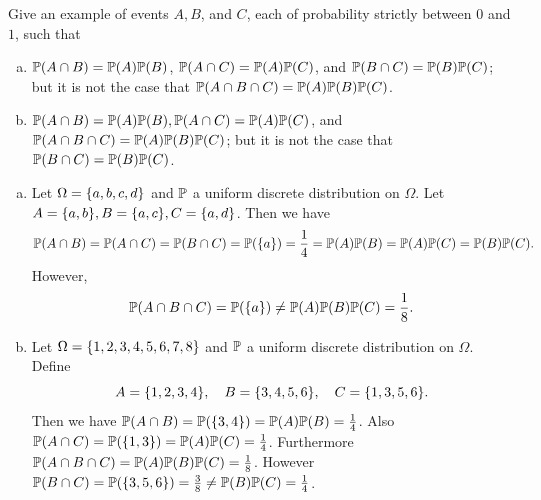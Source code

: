 \begin{problem}
	Give an example of events $ A,B $, and $ C $, each of probability strictly between $ 0 $ and $ 1 $, such that 
	\begin{enumerate}[(a)]
		\item $ \mathbb{P}(A\cap B) = \mathbb{P}(A)\mathbb{P}(B) $, $ \mathbb{P}(A\cap C) = \mathbb{P}(A)\mathbb{P}(C) $, and $ \mathbb{P}(B\cap C) = \mathbb{P}(B)\mathbb{P}(C)$; but it is not the case that $ \mathbb{P}(A\cap B \cap C) = \mathbb{P}(A)\mathbb{P}(B)\mathbb{P}(C) $.
		\item $ \mathbb{P}(A\cap B) = \mathbb{P}(A)\mathbb{P}(B), \mathbb{P}(A\cap C) = \mathbb{P}(A)\mathbb{P}(C) $, and $ \mathbb{P}(A\cap B\cap C) = \mathbb{P}(A)\mathbb{P}(B)\mathbb{P}(C) $; but it is not the case that $ \mathbb{P}(B\cap C) = \mathbb{P}(B)\mathbb{P}(C) $.
	\end{enumerate}
\end{problem}
\begin{solution}
	\begin{enumerate}[(a)]
		\item Let $ \Omega = \{a,b,c,d\} $ and $ \mathbb{P} $ a uniform discrete distribution on $ \Omega $. Let $ A = \{a,b\}, B = \{a,c\}, C = \{a,d\} $. Then we have 
		\[ \mathbb{P}(A\cap B) = \mathbb{P}(A\cap C) = \mathbb{P}(B\cap C) = \mathbb{P}(\{a\})=\frac{1}{4} = \mathbb{P}(A)\mathbb{P}(B) = \mathbb{P}(A)\mathbb{P}(C) = \mathbb{P}(B)\mathbb{P}(C). \]
		However, 
		\[ \mathbb{P}(A\cap B\cap C) = \mathbb{P}(\{a\}) \neq \mathbb{P}(A)\mathbb{P}(B)\mathbb{P}(C) = \frac{1}{8}. \]
		\item Let $ \Omega = \{1,2,3,4,5,6,7,8\} $ and $ \mathbb{P} $ a uniform discrete distribution on $ \Omega $. Define
		\[ A = \{1,2,3,4\}, \quad B = \{3,4,5,6\}, \quad C = \{1,3,5,6\}. \]
		Then we have $ \mathbb{P}(A\cap B) = \mathbb{P}(\{3,4\}) = \mathbb{P}(A)\mathbb{P}(B) = \frac{1}{4} $. Also $ \mathbb{P}(A\cap C) = \mathbb{P}(\{1,3\})=\mathbb{P}(A)\mathbb{P}(C) = \frac{1}{4} $. Furthermore $ \mathbb{P}(A\cap B \cap C) = \mathbb{P}(A)\mathbb{P}(B)\mathbb{P}(C) = \frac{1}{8} $. However $ \mathbb{P}(B\cap C) = \mathbb{P}(\{3,5,6\}) = \frac{3}{8} \neq \mathbb{P}(B)\mathbb{P}(C) = \frac{1}{4}$.
	\end{enumerate}
\end{solution}


